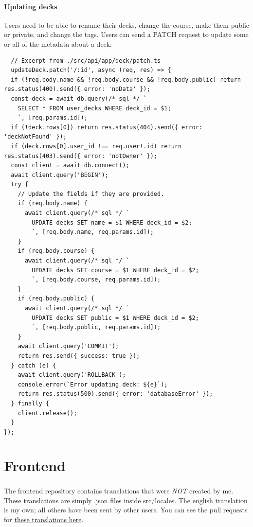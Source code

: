 \documentclass{report}
\begin{document}
\subsubsection{Updating decks}
Users need to be able to rename their decks, change the course, make them public or private, and change the tags. Users can send a PATCH request to update some or all of the metadata about a deck:

  \begin{verbatim}
  // Excerpt from ./src/api/app/deck/patch.ts
  updateDeck.patch('/:id', async (req, res) => {
  if (!req.body.name && !req.body.course && !req.body.public) return res.status(400).send({ error: 'noData' });
  const deck = await db.query(/* sql */ `
    SELECT * FROM user_decks WHERE deck_id = $1;
    `, [req.params.id]);
  if (!deck.rows[0]) return res.status(404).send({ error: 'deckNotFound' });
  if (deck.rows[0].user_id !== req.user!.id) return res.status(403).send({ error: 'notOwner' });
  const client = await db.connect();
  await client.query('BEGIN');
  try {
    // Update the fields if they are provided.
    if (req.body.name) {
      await client.query(/* sql */ `
        UPDATE decks SET name = $1 WHERE deck_id = $2;
        `, [req.body.name, req.params.id]);
    }
    if (req.body.course) {
      await client.query(/* sql */ `
        UPDATE decks SET course = $1 WHERE deck_id = $2;
        `, [req.body.course, req.params.id]);
    }
    if (req.body.public) {
      await client.query(/* sql */ `
        UPDATE decks SET public = $1 WHERE deck_id = $2;
        `, [req.body.public, req.params.id]);
    }
    await client.query('COMMIT');
    return res.send({ success: true });
  } catch (e) {
    await client.query('ROLLBACK');
    console.error(`Error updating deck: ${e}`);
    return res.status(500).send({ error: 'databaseError' });
  } finally {
    client.release();
  }
});
  \end{verbatim}

\chapter{Frontend}

\paragraph{}
The frontend repository contains translations that were \emph{NOT} created by me. These translations are simply .json files inside src/locales. The english translation is my own; all others have been sent by other users. You can see the pull requests for
\href{https://github.com/iroase-app/frontend/pulls?q=is%3Apr+label%3Alocalization+}{these translations here}.
\end{document}
